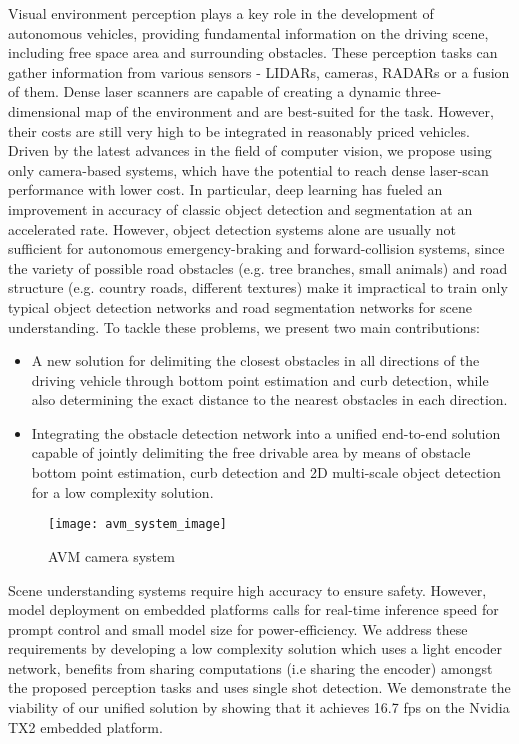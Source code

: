 \documentclass[10pt,twocolumn,letterpaper]{article}
\begin{document}
Visual environment perception plays a key role in the development of autonomous vehicles, providing fundamental information on the driving scene, including free space area and surrounding obstacles. These perception tasks can gather information from various sensors - LIDARs, cameras, RADARs or a fusion of them. Dense laser scanners are capable of creating a dynamic three-dimensional map of the environment and are best-suited for the task. However, their costs are still very high to be integrated in reasonably priced vehicles. Driven by the latest advances in the field of computer vision, we propose using only camera-based systems, which have the potential to reach dense laser-scan performance with lower cost. In particular, deep learning has fueled an improvement in accuracy of classic object detection and segmentation at an accelerated rate. However, object detection systems alone are usually not sufficient for autonomous emergency-braking and forward-collision systems, since the variety of possible road obstacles (e.g. tree branches, small animals) and road structure (e.g. country roads, different textures) make it impractical to train only typical object detection networks and road segmentation networks for scene understanding.  To tackle these problems, we present two main contributions:

\begin{itemize}
\item A new solution for delimiting the closest obstacles in all directions of the driving vehicle through bottom point estimation and curb detection, while also determining the exact distance to the nearest obstacles in each direction.
\item Integrating the obstacle detection network into a unified end-to-end solution capable of jointly delimiting the free drivable area by means of obstacle bottom point estimation, curb detection  and 2D multi-scale object detection for a low complexity solution.
\end{itemize}


\begin{figure}[t]
\begin{center}
\texttt{[image: avm\_system\_image]}
\end{center}
   \caption{AVM camera system}
\label{fig:deepthinq}
\end{figure}

Scene understanding systems require high accuracy to ensure safety. However, model deployment on embedded platforms calls for real-time inference speed for prompt control and small model size for power-efficiency. We address these requirements by developing a low complexity solution which uses a light encoder network, benefits from sharing computations (i.e sharing the encoder) amongst the proposed perception tasks and uses single shot detection. We demonstrate the viability of our unified solution by showing that it achieves 16.7 fps on the Nvidia TX2 embedded platform.
\end{document}
